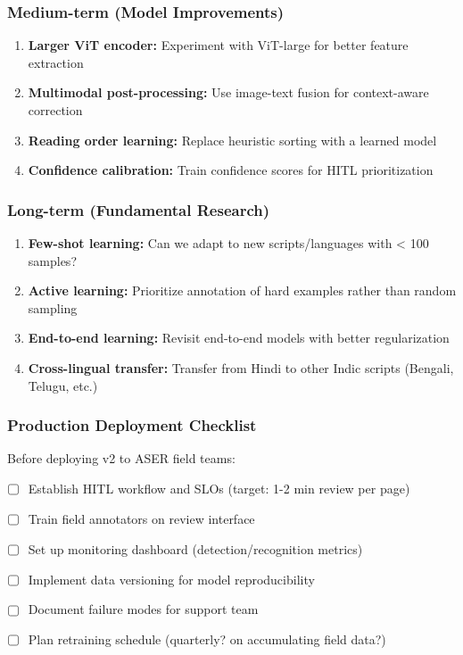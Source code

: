 \documentclass[14pt,a4paper]{article}
\begin{document}
\subsubsection{Medium-term (Model Improvements)}

\begin{enumerate}
    \item \textbf{Larger ViT encoder:} Experiment with ViT-large for better feature extraction
    \item \textbf{Multimodal post-processing:} Use image-text fusion for context-aware correction
    \item \textbf{Reading order learning:} Replace heuristic sorting with a learned model
    \item \textbf{Confidence calibration:} Train confidence scores for HITL prioritization
\end{enumerate}

\subsubsection{Long-term (Fundamental Research)}

\begin{enumerate}
    \item \textbf{Few-shot learning:} Can we adapt to new scripts/languages with < 100 samples?
    \item \textbf{Active learning:} Prioritize annotation of hard examples rather than random sampling
    \item \textbf{End-to-end learning:} Revisit end-to-end models with better regularization
    \item \textbf{Cross-lingual transfer:} Transfer from Hindi to other Indic scripts (Bengali, Telugu, etc.)
\end{enumerate}

\subsubsection{Production Deployment Checklist}

Before deploying v2 to ASER field teams:

\begin{itemize}
    \item ☐ Establish HITL workflow and SLOs (target: 1-2 min review per page)
    \item ☐ Train field annotators on review interface
    \item ☐ Set up monitoring dashboard (detection/recognition metrics)
    \item ☐ Implement data versioning for model reproducibility
    \item ☐ Document failure modes for support team
    \item ☐ Plan retraining schedule (quarterly? on accumulating field data?)
\end{itemize}
\end{document}

